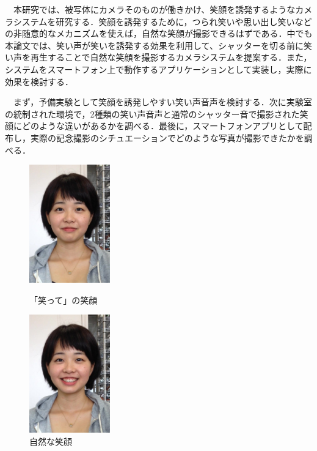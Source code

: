 \documentclass[submit,techreq]{ec2014}
\begin{document}

　本研究では、被写体にカメラそのものが働きかけ、笑顔を誘発するようなカメラシステムを研究する．笑顔を誘発するために，つられ笑いや思い出し笑いなどの非随意的なメカニズムを使えば，自然な笑顔が撮影できるはずである．中でも本論文では、笑い声が笑いを誘発する効果を利用して、シャッターを切る前に笑い声を再生することで自然な笑顔を撮影するカメラシステムを提案する．また，システムをスマートフォン上で動作するアプリケーションとして実装し，実際に効果を検討する．

　まず，予備実験として笑顔を誘発しやすい笑い声音声を検討する．次に実験室の統制された環境で，2種類の笑い声音声と通常のシャッター音で撮影された笑顔にどのような違いがあるかを調べる．最後に，スマートフォンアプリとして配布し，実際の記念撮影のシチュエーションでどのような写真が撮影できたかを調べる．

\begin{figure}[h]
\begin{minipage}{0.49\columnwidth}
\begin{center}
\includegraphics[width=35mm, bb=0 0 572 834]{images/cap_28.jpg}
\caption{「笑って」の笑顔}
\end{center}
\end{minipage}
\begin{minipage}{0.49\columnwidth}
\begin{center}
\includegraphics[width=35mm, bb=0 0 572 834]{images/cap_123.jpg}
\caption{自然な笑顔}
\end{center}
\end{minipage}
\end{figure}
\end{document}
